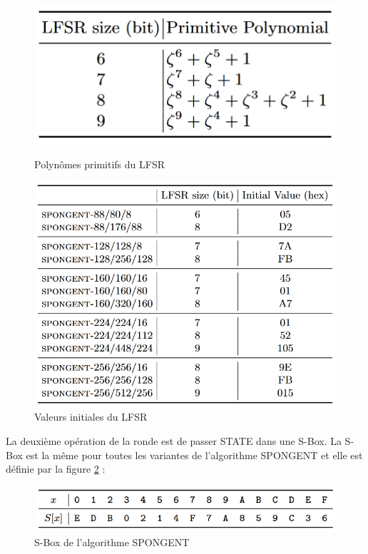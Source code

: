 		\begin{figure}[!htb]
			\begin{minipage}{0.48\textwidth}
			  \centering
			  \includegraphics[width=\textwidth]{imgs/Spongent/PrimiPolySpongent.png}
			  \caption{Polynômes primitifs du LFSR}
			  \label{polyPrimitifsLFSR}
			\end{minipage}
			\hfill
			\begin {minipage}{0.48\textwidth}
			  \centering
			  \includegraphics[width=\textwidth]{imgs/Spongent/valInitLFSR.png}
			  \caption{Valeurs initiales du LFSR}
			  \label{valInitLFSR}
			\end{minipage}
		 \end{figure}
		La deuxième opération de la ronde est de passer STATE dans une S-Box.
		La S-Box est la même pour toutes les variantes de l’algorithme SPONGENT et elle est définie par la figure \ref{sBoxSpongent.png} :

		\begin{figure}[h]
			\centering
			\includegraphics[width=\textwidth]{imgs/Spongent/sBoxSpongent.png}
			\caption{S-Box de l'algorithme SPONGENT}
			\label{sBoxSpongent.png}
		\end{figure}

